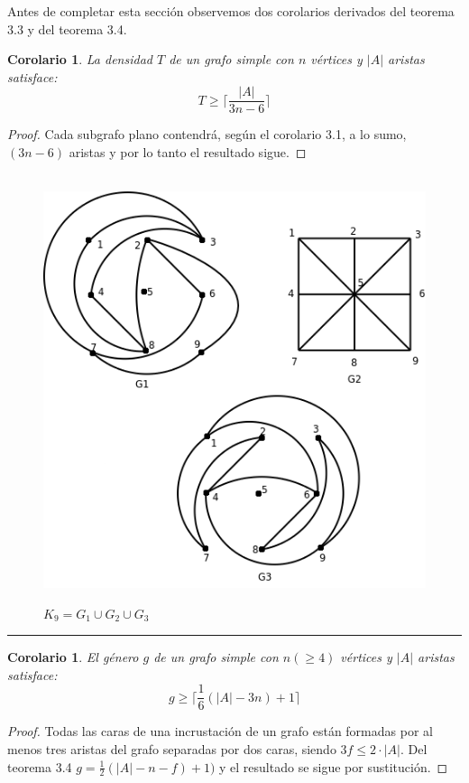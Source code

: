 \documentclass[10pt,a5paper]{book}
\newtheorem{cor}[]{Corolario}[chapter]
\begin{document}
Antes de completar esta sección observemos dos corolarios derivados del teorema 3.3 y del teorema 3.4. 

\begin{cor}
La densidad $T$ de un grafo simple con $n$ vértices y $|A|$ aristas satisface:
\[ T \ge \bigg\lceil \frac{|A|}{3n - 6} \bigg\rceil \]
\end{cor}
\begin{proof}
Cada subgrafo plano contendrá, según el corolario 3.1, a lo sumo, $(3n - 6)$ aristas y por lo tanto el resultado sigue.
\end{proof}
\vfill
\nopagebreak
\begin{figure}[H]
\caption{ }
\hrulefill{}\\
\includegraphics[scale=.4]{Fig3_6.png}\\
\begin{center}$K_9 = G_1 \cup G_2 \cup G_3$\end{center}
\end{figure}
\hrule{}

\begin{cor}
El género $g$ de un grafo simple con $n (\ge 4)$ vértices y $|A|$ aristas satisface:
\[ g \ge \bigg\lceil \frac{1}{6}(|A| -3n) +1 \bigg\rceil \]
\end{cor}
\begin{proof}
Todas las caras de una incrustación de un grafo están formadas por al menos tres aristas del grafo separadas por dos caras, siendo $3f \le 2\cdot|A|$. Del teorema 3.4 $g = \frac{1}{2}(|A| -n -f) +1)$ y el resultado se sigue por sustitución.
\end{proof}
\end{document}
